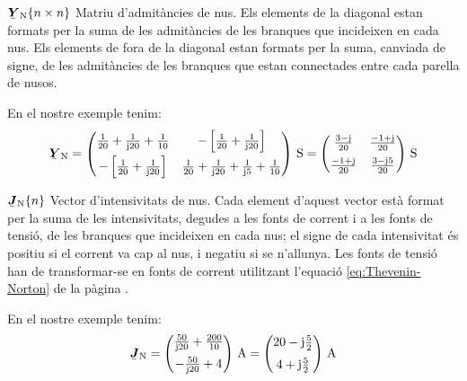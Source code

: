 \begin{list}{}
   {\setlength{\labelwidth}{20mm} \setlength{\leftmargin}{22mm} \setlength{\labelsep}{2mm}}

   \item[$\mcmplx{Y}\ped{N}\{n \times n\}$] Matriu d'admitàncies de nus. Els elements de la diagonal estan formats per la suma de les admitàncies de les branques que incideixen en cada nus.
   Els elements de fora de la diagonal estan formats per la suma, canviada de signe, de les admitàncies de les branques que estan connectades entre cada parella de nusos.

   En el nostre exemple tenim:
   \[
      \mcmplx{Y}\ped{N} =
      \begin{pmatrix}
            \frac{1}{20} + \frac{1}{\ju 20} +  \frac{1}{10} &
            -\left[\frac{1}{20} + \frac{1}{\ju 20}\right] \\[2mm]
            -\left[\frac{1}{20} + \frac{1}{\ju 20}\right]  &
            \frac{1}{20} + \frac{1}{\ju 20} +  \frac{1}{\ju 5} + \frac{1}{10}
      \end{pmatrix}\unit{S} =
      \begin{pmatrix}
            \frac{3 - \ju}{20}  & \frac{-1 + \ju}{20} \\[2mm]
            \frac{-1 + \ju}{20} & \frac{3 - \ju 5}{20}
      \end{pmatrix}\unit{S}
   \]

   \item[$\mcmplx{J}\ped{N}\{n\}$] Vector
d'intensivitats de nus. Cada element d'aquest vector està format per la suma de
les intensivitats, degudes a les fonts de corrent i a les fonts de tensió, de les
branques que incideixen en cada nus; el signe de cada intensivitat és positiu si el
corrent va cap al nus, i negatiu si se n'allunya. Les fonts de tensió han de
transformar-se en fonts de corrent utilitzant l'equació \eqref{eq:Thevenin-Norton} de
la pàgina \pageref{eq:Thevenin-Norton}.

   En el nostre exemple tenim:
   \[
      \mcmplx{J}\ped{N} =
      \begin{pmatrix}
            \frac{50}{\ju 20} +  \frac{200}{10} \\[2mm]
            - \frac{50}{\ju 20} + 4
      \end{pmatrix}\unit{A} =
      \begin{pmatrix}
            20 - \ju \frac{5}{2} \\[2mm]
            4 + \ju \frac{5}{2}
      \end{pmatrix}\unit{A}
   \]

\end{list}

